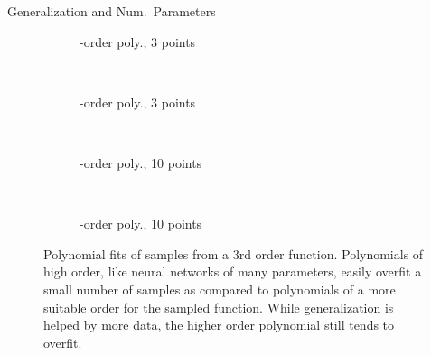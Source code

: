 \documentclass[t,xcolor=dvipsnames]{beamer}
\begin{document}
\begin{frame}{Generalization and Num.\ Parameters}
	\begin{figure}[p]
		\centering
		\begin{subfigure}[t]{0.45\linewidth}
			\resizebox{\linewidth}{!}{}
			\caption{-order poly., 3 points}
			\label{fig:polyfit3rd}
		\end{subfigure}
		~
		\begin{subfigure}[t]{0.45\linewidth}
			\resizebox{\linewidth}{!}{}
			\caption{-order poly., 3 points}
			\label{fig:polyfit20th}
		\end{subfigure}\\	
		\begin{subfigure}[t]{0.45\linewidth}
			\resizebox{\linewidth}{!}{}
			\caption{-order poly., 10 points}
			\label{fig:polyfit3rdlots}
		\end{subfigure}
		~
		\begin{subfigure}[t]{0.45\linewidth}
			\resizebox{\linewidth}{!}{}
			\caption{-order poly., 10 points}
			\label{fig:polyfit20thlots}
		\end{subfigure}
		\caption[Polynomial Data Fitting]{Polynomial fits of samples from a 3rd order function. Polynomials of high order, like neural networks of many parameters, easily overfit a small number of samples as compared to polynomials of a more suitable order for the sampled function. While generalization is helped by more data, the higher order polynomial still tends to overfit.}
		\label{fig:polyfits}
	\end{figure}
\end{frame}

\end{document}
